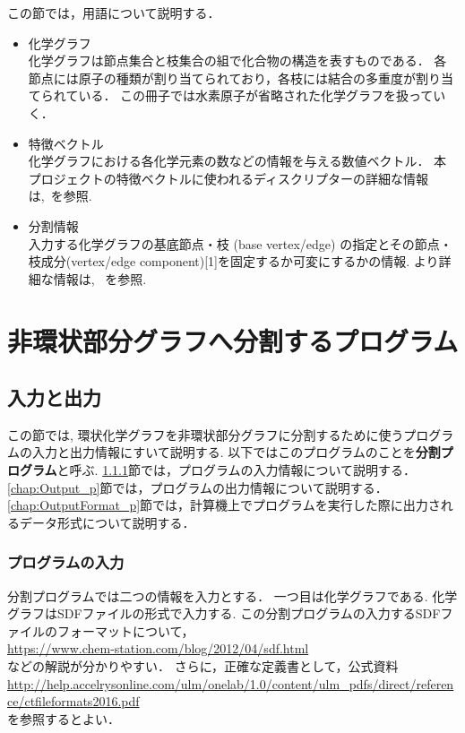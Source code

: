 \documentclass[11pt,titlepage,dvipdfmx,twoside]{jsbook}
\begin{document}
この節では，用語について説明する．
\begin{itemize}	
\item 化学グラフ\\
	化学グラフは節点集合と枝集合の組で化合物の構造を表すものである．
	各節点には原子の種類が割り当てられており，各枝には結合の多重度が割り当てられている．
	この冊子では水素原子が省略された化学グラフを扱っていく．


\item 特徴ベクトル\\
化学グラフにおける各化学元素の数などの情報を与える数値ベクトル．
本プロジェクトの特徴ベクトルに使われるディスクリプターの詳細な情報は,~\cite{branch}を参照.


\item 分割情報\\
入力する化学グラフの基底節点・枝 (base vertex/edge) の指定とその節点・枝成分(vertex/edge component)[1]を固定するか可変にするかの情報.
より詳細な情報は, ~\cite{branch}を参照.


\end{itemize}

\section{非環状部分グラフへ分割するプログラム}
\label{chap: partition}

\subsection{入力と出力}
\label{chap:InOut_p}

この節では, 環状化学グラフを非環状部分グラフに分割するために使うプログラムの入力と出力情報にすいて説明する.
以下ではこのプログラムのことを{\bf 分割プログラム}と呼ぶ.
\ref{chap:Input_p}節では，プログラムの入力情報について説明する．
\ref{chap:Output_p}節では，プログラムの出力情報について説明する．
\ref{chap:OutputFormat_p}節では，計算機上でプログラムを実行した際に出力されるデータ形式について説明する．

\subsubsection{プログラムの入力}
\label{chap:Input_p}

分割プログラムでは二つの情報を入力とする．
一つ目は化学グラフである.
化学グラフはSDFファイルの形式で入力する.
この分割プログラムの入力するSDFファイルのフォーマットについて，\\
\url{https://www.chem-station.com/blog/2012/04/sdf.html}\\
などの解説が分かりやすい．
さらに，正確な定義書として，公式資料\\
\url{http://help.accelrysonline.com/ulm/onelab/1.0/content/ulm_pdfs/direct/reference/ctfileformats2016.pdf}\\
を参照するとよい．
\end{document}
